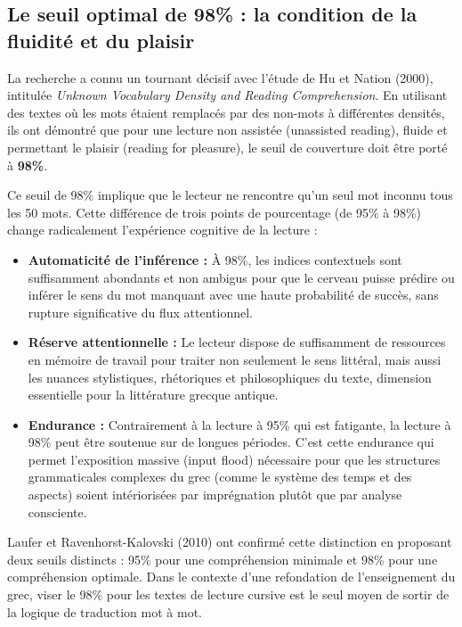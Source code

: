 {\subsection{Le seuil optimal de 98\% : la condition de la fluidité et du plaisir}

La recherche a connu un tournant décisif avec l'étude de Hu et Nation (2000), intitulée
\textit{Unknown Vocabulary Density and Reading Comprehension}. En utilisant des textes où les mots
étaient remplacés par des non-mots à différentes densités, ils ont démontré que pour une lecture non
assistée (unassisted reading), fluide et permettant le plaisir (reading for pleasure), le seuil de
couverture doit être porté à \textbf{98\%}.\cite{III-1-2-ref1}

Ce seuil de 98\% implique que le lecteur ne rencontre qu'un seul mot inconnu tous les 50 mots. Cette
différence de trois points de pourcentage (de 95\% à 98\%) change radicalement l'expérience
cognitive de la lecture :

\begin{itemize}\item \textbf{Automaticité de l'inférence :} À 98\%, les indices contextuels sont suffisamment abondants et non ambigus pour que le cerveau puisse prédire ou inférer le sens du mot manquant avec une haute probabilité de succès, sans rupture significative du flux attentionnel.\cite{III-1-2-ref3}\item \textbf{Réserve attentionnelle :} Le lecteur dispose de suffisamment de ressources en mémoire de travail pour traiter non seulement le sens littéral, mais aussi les nuances stylistiques, rhétoriques et philosophiques du texte, dimension essentielle pour la littérature grecque antique.\cite{III-1-2-ref2}\item \textbf{Endurance :} Contrairement à la lecture à 95\% qui est fatigante, la lecture à 98\% peut être soutenue sur de longues périodes. C'est cette endurance qui permet l'exposition massive (input flood) nécessaire pour que les structures grammaticales complexes du grec (comme le système des temps et des aspects) soient intériorisées par imprégnation plutôt que par analyse consciente.\cite{III-1-2-ref12}\end{itemize}Laufer et Ravenhorst-Kalovski (2010) ont confirmé cette distinction en proposant deux seuils
distincts : 95\% pour une compréhension minimale et 98\% pour une compréhension
optimale.\cite{III-1-2-ref2} Dans le contexte d'une refondation de l'enseignement du grec, viser le
98\% pour les textes de lecture cursive est le seul moyen de sortir de la logique de traduction mot
à mot.



}
